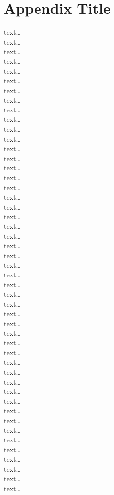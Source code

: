 \chapter{Appendix Title}

text\ldots\\
text\ldots\\
text\ldots\\
text\ldots\\
text\ldots\\
text\ldots\\
text\ldots\\
text\ldots\\
text\ldots\\
text\ldots\\
text\ldots\\
text\ldots\\
text\ldots\\
text\ldots\\
text\ldots\\
text\ldots\\
text\ldots\\
text\ldots\\
text\ldots\\
text\ldots\\
text\ldots\\
text\ldots\\
text\ldots\\
text\ldots\\
text\ldots\\
text\ldots\\
text\ldots\\
text\ldots\\
text\ldots\\
text\ldots\\
text\ldots\\
text\ldots\\
text\ldots\\
text\ldots\\
text\ldots\\
text\ldots\\
text\ldots\\
text\ldots\\
text\ldots\\
text\ldots\\
text\ldots\\
text\ldots\\
text\ldots\\
text\ldots\\
text\ldots\\
text\ldots\\
text\ldots\\
text\ldots\\
